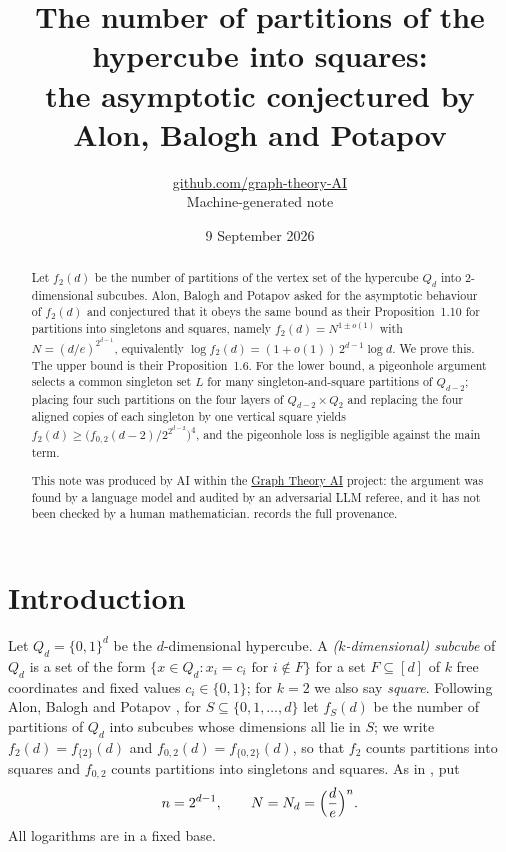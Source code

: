 \documentclass[11pt,a4paper]{article}
\title{The number of partitions of the hypercube into squares:\\ the asymptotic conjectured by Alon, Balogh and Potapov}
\author{\href{https://github.com/graph-theory-AI}{github.com/graph-theory-AI}\\[2pt] \normalsize Machine-generated note}
\date{9 September 2026}
\theoremstyle{plain}
\theoremstyle{definition}
\theoremstyle{remark}
\begin{document}
\maketitle


\begin{abstract}
Let $f_2(d)$ be the number of partitions of the vertex set of the hypercube $Q_d$ into $2$-dimensional subcubes. Alon, Balogh and Potapov asked for the asymptotic behaviour of $f_2(d)$ and conjectured that it obeys the same bound as their Proposition~1.10 for partitions into singletons and squares, namely $f_2(d)=N^{1\pm o(1)}$ with $N=(d/e)^{2^{d-1}}$, equivalently $\log f_2(d)=(1+o(1))\,2^{d-1}\log d$. We prove this. The upper bound is their Proposition~1.6. For the lower bound, a pigeonhole argument selects a common singleton set $L$ for many singleton-and-square partitions of $Q_{d-2}$; placing four such partitions on the four layers of $Q_{d-2}\times Q_2$ and replacing the four aligned copies of each singleton by one vertical square yields $f_2(d)\ge\bigl(f_{0,2}(d-2)/2^{2^{d-2}}\bigr)^4$, and the pigeonhole loss is negligible against the main term.

\medskip\noindent\small
This note was produced by AI within the \href{https://github.com/graph-theory-AI/Graph-Theory-LLM-Proofs}{Graph Theory AI} project:
the argument was found by a language model and audited by an adversarial LLM
referee, and it has not been checked by a human mathematician.
 records the full provenance.

\end{abstract}

\section{Introduction}

Let $Q_d=\{0,1\}^d$ be the $d$-dimensional hypercube. A \emph{($k$-dimensional) subcube} of $Q_d$ is a set of the form $\{x\in Q_d: x_i=c_i \text{ for } i\notin F\}$ for a set $F\subseteq[d]$ of $k$ free coordinates and fixed values $c_i\in\{0,1\}$; for $k=2$ we also say \emph{square}. Following Alon, Balogh and Potapov \cite{ABP}, for $S\subseteq\{0,1,\dots,d\}$ let $f_S(d)$ be the number of partitions of $Q_d$ into subcubes whose dimensions all lie in $S$; we write $f_2(d)=f_{\{2\}}(d)$ and $f_{0,2}(d)=f_{\{0,2\}}(d)$, so that $f_2$ counts partitions into squares and $f_{0,2}$ counts partitions into singletons and squares. As in \cite{ABP}, put
\[
 n=2^{d-1},\qquad N=N_d=\Bigl(\frac de\Bigr)^{n}.
\]
All logarithms are in a fixed base.
\end{document}
